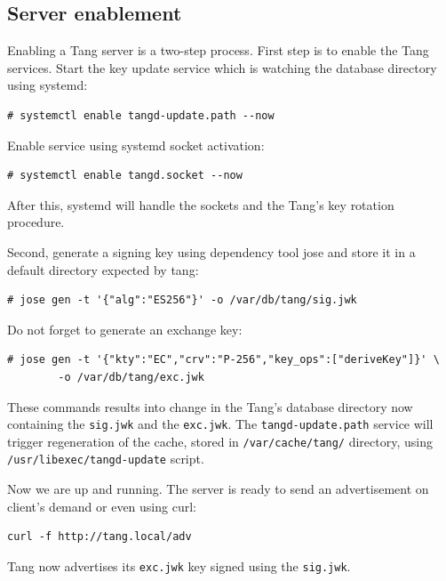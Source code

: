 \subsection{Server enablement}

Enabling a Tang server is a two-step process.
First step is to enable the Tang services.
Start the key update service which is watching the database directory using systemd:
\begin{lstlisting}[columns=fixed,basicstyle=\ttfamily\footnotesize,tabsize=4,backgroundcolor=\color{yellow!10}]
# systemctl enable tangd-update.path --now
\end{lstlisting}
Enable service using systemd socket activation:
\begin{lstlisting}[columns=fixed,basicstyle=\ttfamily\footnotesize,tabsize=4,backgroundcolor=\color{yellow!10}]
# systemctl enable tangd.socket --now
\end{lstlisting}
After this, systemd will handle the sockets and the Tang's key rotation procedure.

Second, generate a signing key using dependency tool jose and store it in a default directory expected by tang:
\begin{lstlisting}[columns=fixed,basicstyle=\ttfamily\footnotesize,tabsize=4,backgroundcolor=\color{yellow!10}]
# jose gen -t '{"alg":"ES256"}' -o /var/db/tang/sig.jwk
\end{lstlisting}
Do not forget to generate an exchange key:
\begin{lstlisting}[columns=fixed,basicstyle=\ttfamily\footnotesize,tabsize=4,backgroundcolor=\color{yellow!10}]
# jose gen -t '{"kty":"EC","crv":"P-256","key_ops":["deriveKey"]}' \
        -o /var/db/tang/exc.jwk
\end{lstlisting}
These commands results into change in the Tang's database directory now containing the {\tt sig.jwk} and the {\tt exc.jwk}.
The {\tt tangd-update.path} service will trigger regeneration of the cache, stored in {\tt /var/cache/tang/} directory, using {\tt /usr/libexec/tangd-update} script.

Now we are up and running.
The server is ready to send an advertisement on client's demand or even using curl:
\begin{lstlisting}[columns=fixed,basicstyle=\ttfamily\footnotesize,tabsize=4,backgroundcolor=\color{yellow!10}]
curl -f http://tang.local/adv
\end{lstlisting}
Tang now advertises its {\tt exc.jwk} key signed using the {\tt sig.jwk}.

